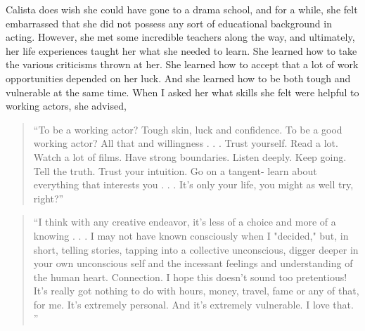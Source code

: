 \begin{multicols}{2}
	Calista does wish she could have gone to a drama school, and for a while, she felt embarrassed that she did not possess any sort of educational background in acting. However, she met some incredible teachers along the way, and ultimately, her life experiences taught her what she needed to learn. She learned how to take the various criticisms thrown at her. She learned how to accept that a lot of work opportunities depended on her luck. And she learned how to be both tough and vulnerable at the same time. When I asked her what skills she felt were helpful to working actors, she advised,
	\begin{quote}
		“To be a working actor? Tough skin, luck and confidence. To be a good working actor? All that and willingness . . . Trust yourself. Read a lot. Watch a lot of films. Have strong boundaries. Listen deeply. Keep going. Tell the truth. Trust your intuition. Go on a tangent- learn about everything that interests you . . . It's only your life, you might as well try, right?”
	\end{quote}
	\begin{quote}
		“I think with any creative endeavor, it's less of a choice and more of a knowing . . . I may not have known consciously when I "decided," but, in short, telling stories, tapping into a collective unconscious, digger deeper in your own unconscious self and the incessant feelings and understanding of the human heart. Connection. I hope this doesn't sound too pretentious! It's really got nothing to do with hours, money, travel, fame or any of that, for me. It's extremely personal. And it's extremely vulnerable. I love that. ”
	\end{quote}


\end{multicols}
